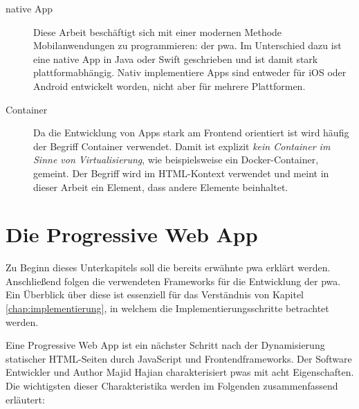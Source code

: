 \begin{description}
	\item [native App]
		Diese Arbeit beschäftigt sich mit einer modernen Methode Mobilanwendungen zu programmieren: der \ac{pwa}. Im Unterschied dazu ist eine native App in Java oder Swift geschrieben und ist damit stark plattformabhängig. Nativ implementiere Apps sind entweder für iOS oder Android entwickelt worden, nicht aber für mehrere Plattformen.
		
	\item [Container]
		Da die Entwicklung von Apps stark am Frontend orientiert ist wird häufig der Begriff Container verwendet. Damit ist explizit \textit{kein Container im Sinne von Virtualisierung}, wie beispielsweise ein Docker-Container, gemeint. Der Begriff wird im HTML-Kontext verwendet und meint in dieser Arbeit ein Element, dass andere Elemente beinhaltet.
	
\end{description}

\section{Die Progressive Web App}
\label{chap:pwa}

Zu Beginn dieses Unterkapitels soll die bereits erwähnte \acf{pwa} erklärt werden. Anschließend folgen die verwendeten Frameworks für die Entwicklung der \ac{pwa}. Ein Überblick über diese ist essenziell für das Verständnis von Kapitel \ref{chap:implementierung}, in welchem die Implementierungsschritte betrachtet werden.

Eine Progressive Web App ist ein nächster Schritt nach der Dynamisierung statischer HTML-Seiten durch JavaScript und Frontendframeworks. Der Software Entwickler und Author Majid Hajian charakterisiert \ac{pwa}s mit acht Eigenschaften. Die wichtigsten dieser Charakteristika werden im Folgenden zusammenfassend erläutert:


